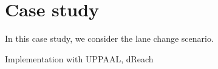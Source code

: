 \section{Case study}
\label{caseStudy}
In this case study, we consider the lane change scenario.

Implementation with UPPAAL, dReach